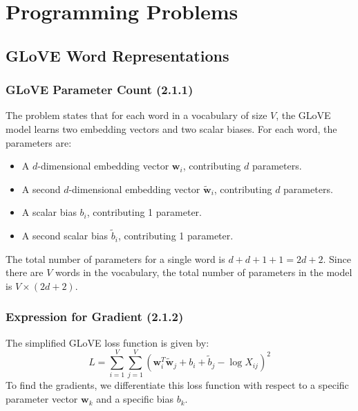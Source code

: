 \documentclass{article}
\begin{document}
\section{Programming Problems}

\subsection{GLoVE Word Representations}

\subsubsection{GLoVE Parameter Count (2.1.1)}

The problem states that for each word in a vocabulary of size $V$, the GLoVE model learns two embedding vectors and two scalar biases. For each word, the parameters are:
\begin{itemize}
    \item A $d$-dimensional embedding vector $\mathbf{w}_i$, contributing $d$ parameters.
    \item A second $d$-dimensional embedding vector $\tilde{\mathbf{w}}_i$, contributing $d$ parameters.
    \item A scalar bias $b_i$, contributing 1 parameter.
    \item A second scalar bias $\tilde{b}_i$, contributing 1 parameter.
\end{itemize}
The total number of parameters for a single word is $d + d + 1 + 1 = 2d + 2$.
Since there are $V$ words in the vocabulary, the total number of parameters in the model is $V \times (2d + 2)$.

\subsubsection{Expression for Gradient (2.1.2)}

The simplified GLoVE loss function is given by:
\[ L = \sum_{i=1}^{V} \sum_{j=1}^{V} \left( \mathbf{w}_i^T \tilde{\mathbf{w}}_j + b_i + \tilde{b}_j - \log X_{ij} \right)^2 \]
To find the gradients, we differentiate this loss function with respect to a specific parameter vector $\mathbf{w}_k$ and a specific bias $b_k$.
\end{document}

